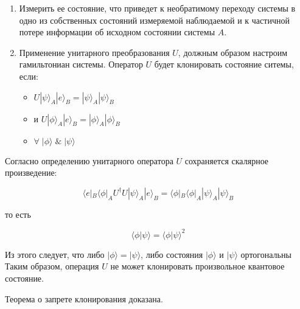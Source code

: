 \documentclass[a4paper]{article}
\begin{document}
\begin{enumerate}
    \item Измерить ее состояние, что приведет к необратимому переходу системы в одно из собственных состояний 
        измеряемой наблюдаемой и к частичной потере информации об исходном состоянии системы $A$.
    \item Применение унитарного преобразования $U$, должным образом настроим гамильтониан системы. 
        Оператор $U$ будет клонировать состояние ситемы, если:
        \begin{itemize}
            \item $U | \psi \rangle_A  |e \rangle_B = | \psi \rangle_A  |\psi \rangle_B$
            \item и $U | \phi \rangle_A  |e \rangle_B = | \phi \rangle_A  |\phi \rangle_B$
            \item $\forall \; |\phi \rangle \; \&  \; |\psi \rangle$
        \end{itemize}
\end{enumerate}

Согласно определению унитарного оператора $U$ сохраняется скалярное произведение:

\begin{equation}
    \langle e |_B \langle \phi |_A U^{\dagger} U |  \psi \rangle_A | e \rangle_B = \langle \phi |_B \langle \phi |_A |  \psi \rangle_A | \psi \rangle_B
\end{equation}

то есть

\begin{equation}
    \langle \phi | \psi \rangle = \langle \phi | \psi \rangle^2
\end{equation}

Из этого следует, что либо $| \phi \rangle = | \psi \rangle$, либо состояния $|\phi \rangle$ и $|\psi \rangle$ ортогональны 
Таким образом, операция $U$ не может клонировать произвольное квантовое состояние.

Теорема о запрете клонирования доказана.
\end{document}
